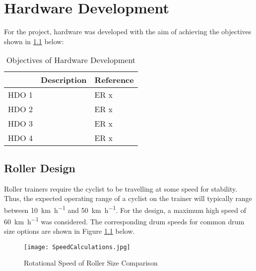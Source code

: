 
\chapter{Hardware Development}

For the project, hardware was developed with the aim of achieving the objectives shown in \ref{tab:devgoals} below:

\begin{table}[H]
	\renewcommand{\arraystretch}{\tablestretch}
	\centering
	\caption{Objectives of Hardware Development}
	\begin{tabularx}{\textwidth}{p{3.2cm} >{\raggedright}X >{\raggedright\arraybackslash}p{2cm}}
		\toprule
		      & Description & Reference \\
		\midrule
		HDO 1 &             & ER x      \\
		HDO 2 &             & ER x      \\
		HDO 3 &             & ER x      \\
		HDO 4 &             & ER x      \\
		\bottomrule
	\end{tabularx}
	\label{tab:devgoals}
\end{table}

\newpage

\section{Roller Design}
\label{sec:opspeed}

Roller trainers require the cyclist to be travelling at some speed for stability. Thus, the expected operating range of a cyclist on the trainer will typically range between \SI{10}{\kilo\meter\per\hour} and \SI{50}{\kilo\meter\per\hour}. For the design, a maximum high speed of \SI{60}{\kilo\meter\per\hour} was considered. The corresponding drum speeds for common drum size options are shown in Figure \ref{fig:speedCalc} below.

\begin{figure}[H]
	\begin{center}
		\texttt{[image: SpeedCalculations.jpg]}
		\caption{Rotational Speed of Roller Size Comparison}
		\label{fig:speedCalc}
	\end{center}
\end{figure}

